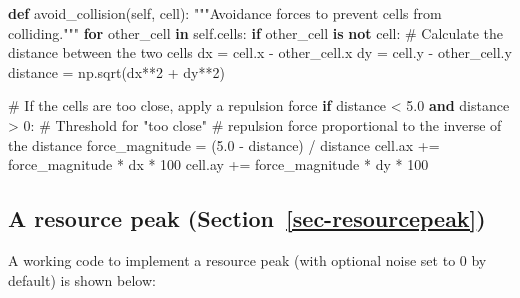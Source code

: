 \documentclass[
  letterpaper,
  DIV=11,
  numbers=noendperiod]{scrreprt}
\newenvironment{Shaded}{\begin{snugshade}}{\end{snugshade}}
\newcommand{\CommentTok}[1]{\textcolor[rgb]{0.37,0.37,0.37}{#1}}
\newcommand{\ControlFlowTok}[1]{\textcolor[rgb]{0.00,0.23,0.31}{\textbf{#1}}}
\newcommand{\DecValTok}[1]{\textcolor[rgb]{0.68,0.00,0.00}{#1}}
\newcommand{\FloatTok}[1]{\textcolor[rgb]{0.68,0.00,0.00}{#1}}
\newcommand{\KeywordTok}[1]{\textcolor[rgb]{0.00,0.23,0.31}{\textbf{#1}}}
\newcommand{\NormalTok}[1]{\textcolor[rgb]{0.00,0.23,0.31}{#1}}
\newcommand{\OperatorTok}[1]{\textcolor[rgb]{0.37,0.37,0.37}{#1}}
\newcommand{\VariableTok}[1]{\textcolor[rgb]{0.07,0.07,0.07}{#1}}
\theoremstyle{definition}
\theoremstyle{remark}
\begin{document}
\begin{Shaded}
\begin{Highlighting}[]
 \KeywordTok{def}\NormalTok{ avoid\_collision(}\VariableTok{self}\NormalTok{, cell):}
        \CommentTok{"""Avoidance forces to prevent cells from colliding."""}
        \ControlFlowTok{for}\NormalTok{ other\_cell }\KeywordTok{in} \VariableTok{self}\NormalTok{.cells:}
            \ControlFlowTok{if}\NormalTok{ other\_cell }\KeywordTok{is} \KeywordTok{not}\NormalTok{ cell:}
                \CommentTok{\# Calculate the distance between the two cells}
\NormalTok{                dx }\OperatorTok{=}\NormalTok{ cell.x }\OperatorTok{{-}}\NormalTok{ other\_cell.x}
\NormalTok{                dy }\OperatorTok{=}\NormalTok{ cell.y }\OperatorTok{{-}}\NormalTok{ other\_cell.y}
\NormalTok{                distance }\OperatorTok{=}\NormalTok{ np.sqrt(dx}\OperatorTok{**}\DecValTok{2} \OperatorTok{+}\NormalTok{ dy}\OperatorTok{**}\DecValTok{2}\NormalTok{)}

                \CommentTok{\# If the cells are too close, apply a repulsion force}
                \ControlFlowTok{if}\NormalTok{ distance }\OperatorTok{\textless{}} \FloatTok{5.0} \KeywordTok{and}\NormalTok{ distance }\OperatorTok{\textgreater{}} \DecValTok{0}\NormalTok{:  }\CommentTok{\# Threshold for "too close"}
                    \CommentTok{\# repulsion force proportional to the inverse of the distance}
\NormalTok{                    force\_magnitude }\OperatorTok{=}\NormalTok{ (}\FloatTok{5.0} \OperatorTok{{-}}\NormalTok{ distance) }\OperatorTok{/}\NormalTok{ distance}
\NormalTok{                    cell.ax }\OperatorTok{+=}\NormalTok{ force\_magnitude }\OperatorTok{*}\NormalTok{ dx  }\OperatorTok{*} \DecValTok{100}
\NormalTok{                    cell.ay }\OperatorTok{+=}\NormalTok{ force\_magnitude }\OperatorTok{*}\NormalTok{ dy }\OperatorTok{*} \DecValTok{100}
\end{Highlighting}
\end{Shaded}

\subsection{\texorpdfstring{A resource peak
(Section~\ref{sec-resourcepeak})}{A resource peak (Section~)}}\label{a-resource-peak-sec-resourcepeak}

A working code to implement a resource peak (with optional noise set to
0 by default) is shown below:
\end{document}
